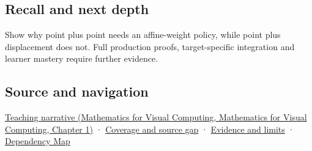 \subsection{Recall and next depth}\label{appendix-0659864c0aa3-recall-and-next-depth}

Show why point plus point needs an affine-weight policy, while point plus displacement does not. Full production proofs, target-specific integration and learner mastery require further evidence.

\subsection{Source and navigation}\label{appendix-0659864c0aa3-source-and-navigation}

\href{../02-Mathematics-for-Visual-Computing/main.pdf\#nameddest=01-foundations-i-ch017-an-arrow-is-not-the-address-written-beside-it}{Teaching narrative (Mathematics for Visual Computing, Mathematics for Visual Computing, Chapter 1)} · \hyperref[appendix-fd090d982a15-phase-6---parts-501-600]{Coverage and source gap} · \hyperref[appendix-a103e7846d21-phase-6---source-analysis-and-verification]{Evidence and limits} · \hyperref[appendix-4ad47bdd269a]{Dependency Map}
